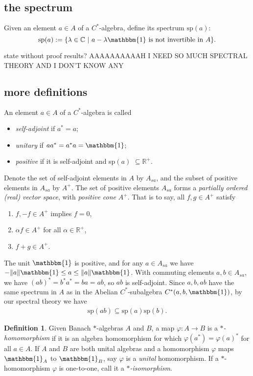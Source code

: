 \documentclass[12pt,a4paper]{amsart}
\theoremstyle{plain}
\theoremstyle{definition}
\newtheorem{defn}{Definition}
\newcommand{\1}{\mathbbm{1}}
\newcommand{\C}{\mathbb{C}}
\newcommand{\R}{\mathbb{R}}
\renewcommand{\phi}{\varphi}
\newcommand{\spec}[1]{\mbox{sp}(#1)}
\begin{document}
\subsection{the spectrum}
Given an element $a \in A$ of a $C^\ast$-algebra, define its spectrum $\spec{a}$:
\[
	\spec{a}:=\{\lambda\in \C ~|~ a-\lambda \1 \mbox{ is not invertible in }A\}.
\]

state without proof results?
AAAAAAAAAAH I NEED SO MUCH SPECTRAL THEORY AND I DON'T KNOW ANY

\subsection{more definitions}
An element $a\in A$ of a $C^\ast$-algebra is called  %
\begin{itemize}
	\item \emph{self-adjoint} if $a^\ast=a$;
	\item \emph{unitary} if $aa^\ast=a^\ast a = \1$;
	\item \emph{positive} if it is self-adjoint and sp$(a)$ $\subseteq \R^+$.
\end{itemize}
Denote the set of self-adjoint elements in $A$ by $A_{sa}$, and the subset of positive 
elements in $A_{sa}$ by $A^+$. The set of positive elements $A_{sa}$ forms a \emph{partially ordered 
(real) vector space}, with \emph{positive cone} $A^+$. That is to say, all $f,g \in A^+$ satisfy
\begin{enumerate}
	\item 	$f,-f\in A^+$ implies $f=0$,
	\item	$\alpha f\in A^+$ for all $\alpha\in \R^+$,
	\item	$f+g \in A^+$.
\end{enumerate}
The unit $\1$ is positive, and for any $a\in A_{sa}$ we have $-\|a\|\1 \leq a \leq \|a\|\1$. 
With commuting elements $a,b\in A_{sa}$, we have $(ab)^\ast = b^\ast a^\ast = ba = ab$, so 
$ab$ is self-adjoint. Since $a,b,ab$ have the same spectrum in $A$ as in the Abelian 
$C^\ast$-subalgebra $C^\ast(a,b,\1)$, by our spectral theory we have 
\begin{align*}
	\spec{ab} \subseteq \spec{a}\spec{b}.
\end{align*}

\begin{defn}
	Given Banach $\ast$-algebras $A$ and $B$, a map $\phi:A\to B$ is a \emph{$\ast$-homomorphism} 
	if it is an algebra homomorphism for which $\phi(a^\ast) = \phi(a)^\ast$ for all $a \in A$.
	If $A$ and $B$ are both unital algebras and a homomorphism $\phi$ maps $\1_A$ to $\1_B$, 
	say $\phi$ is a \emph{unital} homomorphism.     %
	If a $\ast$-homomorphism $\phi$ is one-to-one, call it a \emph{$\ast$-isomorphism}.
\end{defn}
\end{document}
